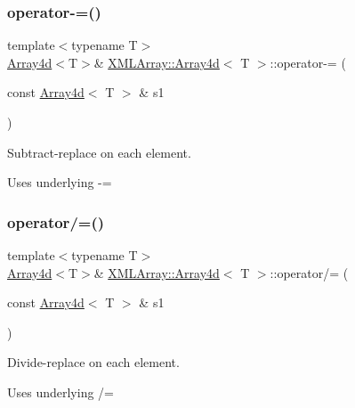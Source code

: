 \subsubsection{\texorpdfstring{operator-\/=()}{operator-=()}\hspace{0.1cm}{\footnotesize\ttfamily [3/3]}}
{\footnotesize\ttfamily template$<$typename T$>$ \\
\mbox{\hyperlink{classXMLArray_1_1Array4d}{Array4d}}$<$T$>$\& \mbox{\hyperlink{classXMLArray_1_1Array4d}{X\+M\+L\+Array\+::\+Array4d}}$<$ T $>$\+::operator-\/= (\begin{DoxyParamCaption}\item[{const \mbox{\hyperlink{classXMLArray_1_1Array4d}{Array4d}}$<$ T $>$ \&}]{s1 }\end{DoxyParamCaption})\hspace{0.3cm}{\ttfamily [inline]}}



Subtract-\/replace on each element. 

Uses underlying -\/= \mbox{\label{classXMLArray_1_1Array4d_ac8d0ba2bc4f085bf48baf6530db0cfcb}} 
\subsubsection{\texorpdfstring{operator/=()}{operator/=()}\hspace{0.1cm}{\footnotesize\ttfamily [1/6]}}
{\footnotesize\ttfamily template$<$typename T$>$ \\
\mbox{\hyperlink{classXMLArray_1_1Array4d}{Array4d}}$<$T$>$\& \mbox{\hyperlink{classXMLArray_1_1Array4d}{X\+M\+L\+Array\+::\+Array4d}}$<$ T $>$\+::operator/= (\begin{DoxyParamCaption}\item[{const \mbox{\hyperlink{classXMLArray_1_1Array4d}{Array4d}}$<$ T $>$ \&}]{s1 }\end{DoxyParamCaption})\hspace{0.3cm}{\ttfamily [inline]}}



Divide-\/replace on each element. 

Uses underlying /= \mbox{\label{classXMLArray_1_1Array4d_ac8d0ba2bc4f085bf48baf6530db0cfcb}} 
